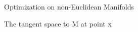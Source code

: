 

Optimization on non-Euclidean Manifolds

The tangent space to M at point x

\graphicspath{{Chapter3-Manifolds/Figs/}{Chapter3-Manifolds/Figs/Humanoids2015/}}

